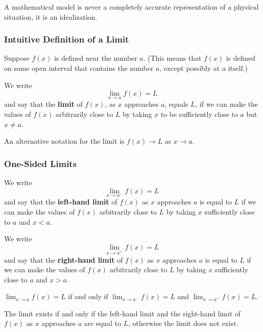 A mathematical model is never a completely accurate representation of a
physical situation, it is an idealization.

\subsubsection*{Intuitive Definition of a Limit}
Suppose \(f(x)\) is defined near the number \(a\).
(This means that \(f(x)\) is defined on some open interval that contains the
number \(a\),
except possibly at \(a\) itself.)
\begin{definition}
    We write
    \[\lim_{x\to a}f(x)=L\]
    and say that the \textbf{limit} of \(f(x)\),
    as \(x\) approaches \(a\),
    equals \(L\),
    if we can make the values of \(f(x)\) arbitrarily close to \(L\) by taking
    \(x\) to be sufficiently close to \(a\) but \(x\neq a\).
\end{definition}
An alternative notation for the limit is \(f(x)\to L\) as \(x\to a\).

\subsubsection*{One-Sided Limits}
\begin{definition}
    We write
    \[\lim_{x\to a^-}f(x)=L\]
    and say that the \textbf{left-hand limit} of \(f(x)\) as \(x\) approaches
    \(a\) is equal to \(L\) if we can make the values of \(f(x)\) arbitrarily
    close to \(L\) by taking \(x\) sufficiently close to \(a\) and \(x<a\).
\end{definition}
\begin{definition}
    We write
    \[\lim_{x\to a^+}f(x)=L\]
    and say that the \textbf{right-hand limit} of \(f(x)\) as \(x\) approaches
    \(a\) is equal to \(L\) if we can make the values of \(f(x)\) arbitrarily
    close to \(L\) by taking \(x\) sufficiently close to \(a\) and \(x>a\).
\end{definition}
\begin{theorem}
    \(\displaystyle{\lim_{x\to a}f(x)=L}\) if and only if
    \(\displaystyle{\lim_{x\to a^-}f(x)}=L\) and
    \(\displaystyle{\lim_{x\to a^+}f(x)}=L\).
\end{theorem}
The limit exists if and only if the left-hand limit and the right-hand limit
of \(f(x)\) as \(x\) approaches \(a\) are equal to \(L\),
otherwise the limit does not exist.